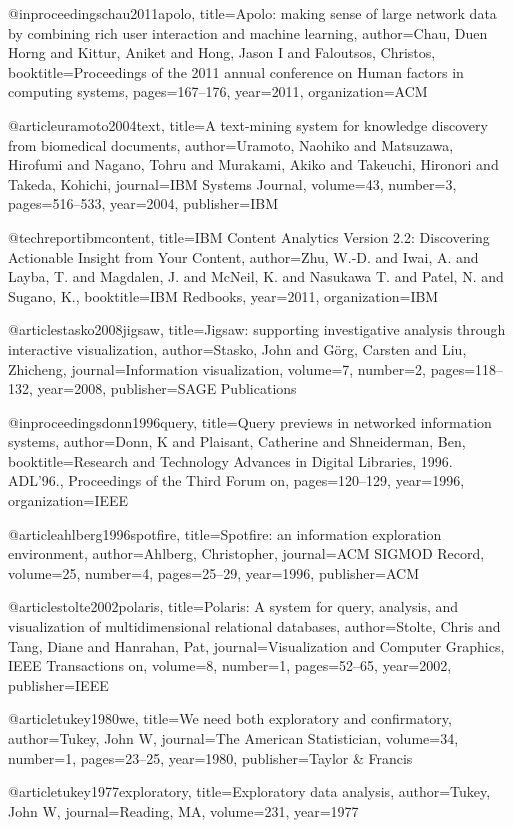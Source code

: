 @inproceedings{chau2011apolo,
  title={Apolo: making sense of large network data by combining rich user interaction and machine learning},
  author={Chau, Duen Horng and Kittur, Aniket and Hong, Jason I and Faloutsos, Christos},
  booktitle={Proceedings of the 2011 annual conference on Human factors in computing systems},
  pages={167--176},
  year={2011},
  organization={ACM}
}

@article{uramoto2004text,
  title={A text-mining system for knowledge discovery from biomedical documents},
  author={Uramoto, Naohiko and Matsuzawa, Hirofumi and Nagano, Tohru and Murakami, Akiko and Takeuchi, Hironori and Takeda, Kohichi},
  journal={IBM Systems Journal},
  volume={43},
  number={3},
  pages={516--533},
  year={2004},
  publisher={IBM}
}

@techreport{ibmcontent,
  title={IBM Content Analytics Version 2.2: Discovering Actionable Insight from Your Content},
  author={Zhu, W.-D. and Iwai, A. and Layba, T. and Magdalen, J. and McNeil, K. and Nasukawa T. and Patel, N. and Sugano, K.},
  booktitle={IBM Redbooks},
  year={2011},
  organization={IBM}
}

@article{stasko2008jigsaw,
  title={Jigsaw: supporting investigative analysis through interactive visualization},
  author={Stasko, John and G{\"o}rg, Carsten and Liu, Zhicheng},
  journal={Information visualization},
  volume={7},
  number={2},
  pages={118--132},
  year={2008},
  publisher={SAGE Publications}
}

@inproceedings{donn1996query,
  title={Query previews in networked information systems},
  author={Donn, K and Plaisant, Catherine and Shneiderman, Ben},
  booktitle={Research and Technology Advances in Digital Libraries, 1996. ADL'96., Proceedings of the Third Forum on},
  pages={120--129},
  year={1996},
  organization={IEEE}
}

@article{ahlberg1996spotfire,
  title={Spotfire: an information exploration environment},
  author={Ahlberg, Christopher},
  journal={ACM SIGMOD Record},
  volume={25},
  number={4},
  pages={25--29},
  year={1996},
  publisher={ACM}
}

@article{stolte2002polaris,
  title={Polaris: A system for query, analysis, and visualization of multidimensional relational databases},
  author={Stolte, Chris and Tang, Diane and Hanrahan, Pat},
  journal={Visualization and Computer Graphics, IEEE Transactions on},
  volume={8},
  number={1},
  pages={52--65},
  year={2002},
  publisher={IEEE}
}

@article{tukey1980we,
  title={We need both exploratory and confirmatory},
  author={Tukey, John W},
  journal={The American Statistician},
  volume={34},
  number={1},
  pages={23--25},
  year={1980},
  publisher={Taylor \& Francis}
}

@article{tukey1977exploratory,
  title={Exploratory data analysis},
  author={Tukey, John W},
  journal={Reading, MA},
  volume={231},
  year={1977}
}
